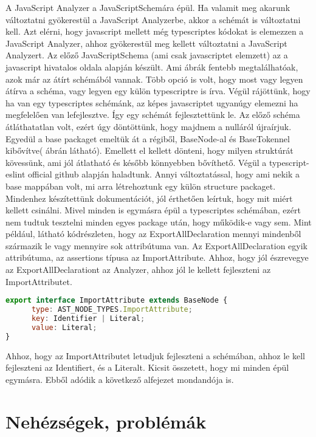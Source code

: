 \noindent

A JavaScript Analyzer a JavaScriptSchemára épül. Ha valamit meg akarunk változtatni gyökerestül a JavaScript Analyzerbe, akkor a schémát is változtatni kell.
Azt elérni, hogy javascript mellett még typescriptes kódokat is elemezzen a JavaScript Analyzer, ahhoz gyökerestül meg kellett változtatni a JavaScript Analyzert.
Az előző JavaScriptSchema (ami csak javascriptet elemzett) az a javascript hivatalos oldala alapján készült. Ami ábrák fentebb megtalálhatóak, azok már az átírt schémából vannak.
Több opció is volt, hogy most vagy legyen átírva a schéma, vagy legyen egy külön typescriptre is írva.
Végül rájöttünk, hogy ha van egy typescriptes schémánk, az képes javascriptet ugyanúgy elemezni ha megfelelően van lefejlesztve.
Így egy schémát fejlesztettünk le. Az előző schéma átláthatatlan volt, ezért úgy döntöttünk, hogy majdnem a nulláról újraírjuk.
Egyedül a base packaget emeltük át a régiből, BaseNode-al és BaseTokennel kibővítve( ábrán látható).
Emellett el kellett dönteni, hogy milyen struktúrát kövessünk, ami jól átlatható és később könnyebben bővíthető.
Végül a typescript-eslint official github alapján haladtunk. Annyi változtatással, hogy ami nekik a base mappában volt, mi arra létrehoztunk egy külön structure packaget.
Mindenhez készítettünk dokumentációt, jól érthetően leírtuk, hogy mit miért kellett csinálni.
Mivel minden is egymásra épül a typescriptes schémában, ezért nem tudtuk tesztelni minden egyes package után, hogy működik-e vagy sem.
Mint például, látható  kódrészleten, hogy az ExportAllDeclaration mennyi mindenből származik le vagy mennyire sok attribútuma van.
Az ExportAllDeclaration egyik attribútuma, az assertions típusa az ImportAttribute. Ahhoz, hogy jól észrevegye az ExportAllDeclarationt az Analyzer, ahhoz jól le kellett fejleszteni az ImportAttributet.

\begin{lstlisting}[caption={ImportAttribute},label={lst:asg_file_import_attribute}, language={JavaScript}]
export interface ImportAttribute extends BaseNode {
      type: AST_NODE_TYPES.ImportAttribute;
      key: Identifier | Literal;
      value: Literal;
}
\end{lstlisting}
Ahhoz, hogy az ImportAttributet letudjuk fejleszteni a schémában, ahhoz le kell fejleszteni az Identifiert, és a Literalt.
Kicsit összetett, hogy mi minden épül egymásra. Ebből adódik a következő alfejezet mondandója is.

\section{Nehézségek, problémák}

